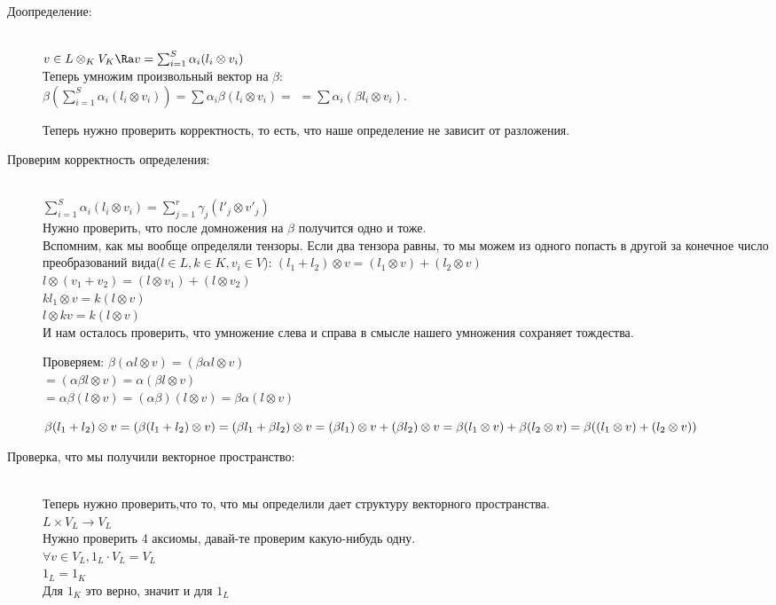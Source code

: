 \begin{description}
\begin{description}
\begin{description}
    \item[Доопределение:] \hfill \\
$v \in L \otimes_K V_K \Ra v = \sum_{i = 1}^{S}\alpha_i (l_i \otimes v_i)$\\
Теперь умножим произвольный вектор на $\beta:$\\
$\beta (\sum_{i = 1}^{S}\alpha_i(l_i \otimes v_i)) = \sum \alpha_i \beta(l_i \otimes v_i) = $
$= \sum \alpha_i(\beta l_i \otimes v_i)$.

Теперь нужно проверить корректность, то есть, 
что наше определение не зависит от разложения.

    \item[Проверим корректность определения:]\hfill \\
$\sum_{i = 1}^{S}\alpha_i(l_i \otimes v_i) = \sum_{j = 1}^{r}\gamma_j(l'_j \otimes v'_j)$\\
Нужно проверить, что после домножения на $\beta$ получится одно и тоже.\\

Вспомним, как мы вообще определяли тензоры. Если два тензора равны, то мы можем из 
одного попасть в другой за конечное число преобразований вида($l \in L, k \in K, v_i \in V$):
$(l_1 + l_2)\otimes v = (l_1 \otimes v) + (l_2\otimes v)$ \\
$l\otimes(v_1 + v_2) = (l\otimes v_1) + (l \otimes v_2)$ \\
$kl_1 \otimes v =  k(l\otimes v)$\\ 
$l\otimes kv = k(l\otimes v)$\\

И нам осталось проверить, что умножение слева и справа в смысле нашего умножения
сохраняет тождества.

Проверяем:
$\beta(\alpha l \otimes v) = (\beta \alpha l \otimes v)$\\
$= (\alpha \beta l \otimes v) = \alpha (\beta l \otimes v)$\\
$= \alpha \beta(l \otimes v) = (\alpha \beta)(l \otimes v) = \beta \alpha (l \otimes v)$

$\beta(l_1 + l_2)\otimes v = (\beta(l_1 + l_2) \otimes v) = (\beta l_1 + \beta l_2)\otimes v = \\
(\beta l_1) \otimes v + (\beta l_2) \otimes v = \beta(l_1 \otimes v)+ \beta(l_2 \otimes v) = \beta((l_1 \otimes v) + (l_2 \otimes v))$                                       

\item[Проверка, что мы получили векторное пространство:]  \hfill \\
Теперь нужно проверить,что то, что мы определили дает структуру векторного пространства.\\ 
$L \times V_L \to V_L$\\
Нужно проверить 4 аксиомы, давай-те проверим какую-нибудь одну.\\ 
$\forall v \in V_L, 1_L\cdot V_L = V_L$\\
$1_L = 1_K$\\
Для $1_K$ это верно, значит и для $1_L$\\


\end{description}
\end{description}
\end{description}
